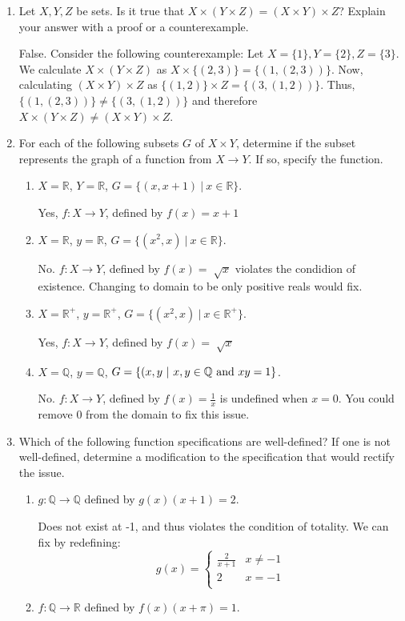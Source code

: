 \documentclass[12pt]{article}
\newcommand{\R}{\mathbb{R}}
\newcommand{\Q}{\mathbb{Q}}
\begin{document}
\begin{enumerate}
\item Let $X, Y, Z$ be sets. Is it true that $X\times (Y\times Z) = (X\times Y)\times Z$? Explain your answer with a proof or a counterexample.

False. Consider the following counterexample: Let $X = \{1\}, Y = \{2\}, Z = \{3\}$. We calculate $X\times (Y\times Z)$ as $X\times \{(2, 3)\} = \{(1, (2,3))\}$. Now, calculating $(X\times Y)\times Z$ as $\{(1,2)\}\times Z= \{(3, (1,2))\}$. Thus, $\{(1, (2,3))\} \neq \{(3, (1,2))\}$ and therefore $X\times (Y\times Z) \neq (X\times Y)\times Z$.

\item For each of the following subsets $G$ of $X\times Y$, determine if the subset represents the graph of a function from $X\to Y$. If so, specify the function.
\begin{enumerate}
\item $X=\R$, $Y=\R$, $G = \{(x, x+1)\ |\ x\in \R\}$.

Yes, $f:X \to Y$, defined by $f(x) = x + 1$
\item $X=\R$, $y=\R$, $G=\{(x^2, x)\ | \ x\in \R\}$.

No. $f:X \to Y$, defined by $f(x) = \sqrt[]{x}$ violates the condidion of existence. Changing to domain to be only positive reals would fix. 
\item $X=\R^+$, $y=\R^+$, $G=\{(x^2, x)\ | \ x\in \R^+\}$.

Yes, $f:X \to Y$, defined by $f(x) = \sqrt[]{x}$
\item $X=\Q$, $y=\Q$, $G=\{(x, y\ | \ x, y\in \Q\hbox{ and }xy=1\}$.

No. $f:X \to Y$, defined by $f(x) = \frac{1}{x}$ is undefined when $x=0$. You could remove $0$ from the domain to fix this issue. 
\end{enumerate}

\item Which of the following function specifications are well-defined? If one is not well-defined, determine a modification to the specification that would rectify the issue.
\begin{enumerate}
\item $g:\Q\to\Q$ defined by $g(x)(x+1)=2$.

Does not exist at -1, and thus violates the condition of totality. We can fix by redefining: 
\[ g(x) =  \begin{cases} 
      \frac{2}{x + 1} & x\neq -1 \\
      2 & x = -1 \\
   \end{cases}
\]
\item $f:\Q\to\R$ defined by $f(x)(x+\pi)=1$.


\end{enumerate}
\end{enumerate}
\end{document}
